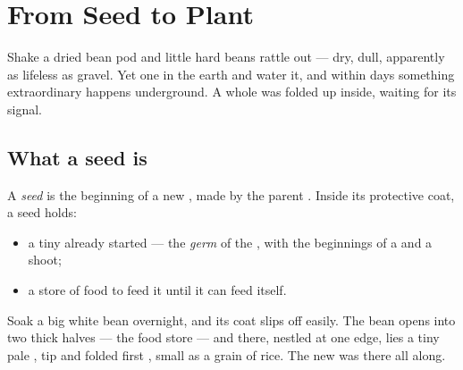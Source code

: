 \chapter{From Seed to Plant}\label{ch:g2:from-seed-to-plant}

Shake a dried bean pod and little hard beans rattle out --- dry,
dull, apparently as lifeless as gravel. Yet  one in the earth
and water it, and within days something extraordinary happens
underground. A whole  was folded up inside, waiting for its
signal.

\section{What a seed is}

\begin{definition}[Seed]\label{def:g2:from-seed-to-plant:seed}
A \emph{seed} is the beginning of a new , made by
the parent . Inside its protective coat, a seed holds:
\begin{itemize}
  \item a tiny  already started --- the
        \emph{germ} of the , with the
        beginnings of a  and a shoot;
  \item a store of food to feed it until it can feed itself.
\end{itemize}
\end{definition}

\begin{example}\label{ex:g2:from-seed-to-plant:open}
Soak a big white bean overnight, and its coat slips off easily.
The bean opens into two thick halves --- the food store --- and
there, nestled at one edge, lies a tiny pale ,  tip and
folded first , small as a grain of rice. The new  was
there all along.
\end{example}

